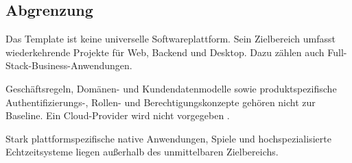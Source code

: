 \subsection{Abgrenzung}
\label{subsec:abgrenzung}

Das Template ist keine universelle Softwareplattform. Sein Zielbereich umfasst
wiederkehrende Projekte für Web, Backend und Desktop. Dazu zählen auch
Full-Stack-Business-Anwendungen.

Geschäftsregeln, Domänen- und Kundendatenmodelle sowie produktspezifische
Authentifizierungs-, Rollen- und Berechtigungskonzepte gehören nicht zur
Baseline. Ein Cloud-Provider wird nicht vorgegeben
\parencite{kleiveist2026architecture}.

Stark plattformspezifische native Anwendungen, Spiele und hochspezialisierte
Echtzeitsysteme liegen außerhalb des unmittelbaren Zielbereichs.
